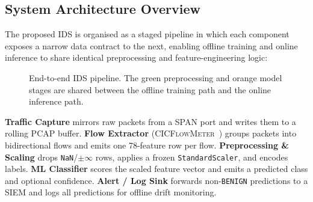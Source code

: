 \subsection{System Architecture Overview}
\label{sec:arch-overview}

The proposed IDS is organised as a staged pipeline in which each component exposes a narrow data contract to the next, enabling offline training and online inference to share identical preprocessing and feature-engineering logic:

\begin{figure}[h]
\centering
{}
\caption{End-to-end IDS pipeline. The green preprocessing and orange model stages are shared between the offline training path and the online inference path.}
\label{fig:pipeline}
\end{figure}

\textbf{Traffic Capture} mirrors raw packets from a SPAN port and writes them to a rolling PCAP buffer.
\textbf{Flow Extractor} (\textsc{CICFlowMeter}~\cite{ref_cicflowmeter}) groups packets into bidirectional flows and emits one 78-feature row per flow.
\textbf{Preprocessing \& Scaling} drops \texttt{NaN}/$\pm\infty$ rows, applies a frozen \texttt{StandardScaler}, and encodes labels.
\textbf{ML Classifier} scores the scaled feature vector and emits a predicted class and optional confidence.
\textbf{Alert / Log Sink} forwards non-\texttt{BENIGN} predictions to a SIEM and logs all predictions for offline drift monitoring.
